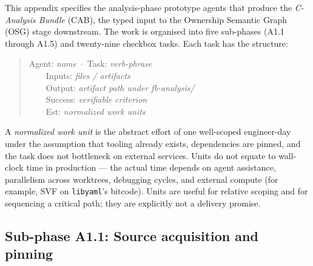 \documentclass[12pt]{article}
\newcommand{\libyaml}{\texttt{libyaml}}
\theoremstyle{definition}
\theoremstyle{remark}
\begin{document}
This appendix specifies the analysis-phase prototype agents that produce the \emph{C-Analysis Bundle} (CAB), the typed input to the Ownership Semantic Graph (OSG) stage downstream. The work is organised into five sub-phases (A1.1 through A1.5) and twenty-nine checkbox tasks. Each task has the structure:

\begin{quote}\small\ttfamily
[~] Agent: \textit{name}~$\cdot$~Task: \textit{verb-phrase}\\
~~~~Inputs: \textit{files / artifacts}\\
~~~~Output: \textit{artifact path under fb-analysis/}\\
~~~~Success: \textit{verifiable criterion}\\
~~~~Est: \textit{normalized work units}
\end{quote}

A \emph{normalized work unit} is the abstract effort of one well-scoped engineer-day under the assumption that tooling already exists, dependencies are pinned, and the task does not bottleneck on external services. Units do not equate to wall-clock time in production --- the actual time depends on agent assistance, parallelism across worktrees, debugging cycles, and external compute (for example, SVF on \libyaml{}'s bitcode). Units are useful for relative scoping and for sequencing a critical path; they are explicitly not a delivery promise.

\subsection{Sub-phase A1.1: Source acquisition and pinning}
\end{document}
